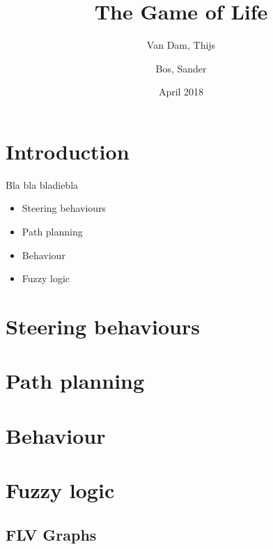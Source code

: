 \documentclass[11pt]{extarticle}
\author{Van Dam, Thijs\\
\and
Bos, Sander\\
}
\title{\huge The Game of Life}
\date{April 2018}
\begin{document}
    \maketitle
    \thispagestyle{empty}
    \newpage
    \newpage
    \setcounter{page}{1}
    \section{Introduction}\label{sec:introduction}
    Bla bla bladiebla
    \begin{itemize}
        \item Steering behaviours
        \item Path planning
        \item Behaviour
        \item Fuzzy logic
    \end{itemize}

    \newpage
    \tableofcontents
    \newpage
    \section{Steering behaviours}\label{sec:steering}
    

    \section{Path planning}\label{sec:pathPlanning}

    \newpage
    \section{Behaviour}\label{sec:behaviour}

    \newpage
    \section{Fuzzy logic}\label{sec:fuzzyLogic}
    \subsection{FLV Graphs}
\end{document}
